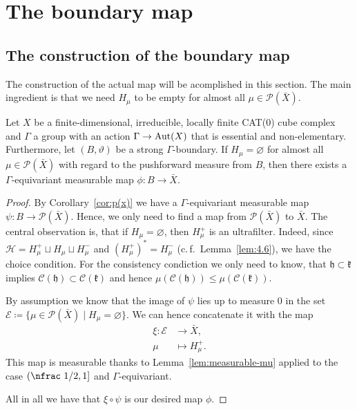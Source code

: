\section{The boundary map}
\label{sec:map}

\subsection{The construction of the boundary map}
\label{sec:treminal-elements}

The construction of the actual map will be acomplished in this section. The main ingredient is that we need \(H_\mu\) to be empty for almost all \(\mu \in \mathcal{P}(\bar X)\). 

\begin{lemma}
  \label{lem:H=0}
  Let \(X\) be a finite-dimensional, irreducible, locally finite CAT(0) cube complex and \(\Gamma\) a group with an action \(\Gamma \to \operatorname{Aut}(X)\) that is essential and non-elementary. Furthermore, let \((B, \vartheta)\) be a strong \(\Gamma\)-boundary. If \(H_\mu = \varnothing\) for almost all \(\mu \in \mathcal{P}(\bar X)\) with regard to the pushforward measure from \(B\), then there exists a \(\Gamma\)-equivariant measurable map \(\phi\colon B \to \bar X\).
\end{lemma}

\begin{proof}
  By Corollary~\ref{cor:p(x)} we have a \(\Gamma\)-equivariant measurable map \(\psi\colon B \to \mathcal{P}(\bar X)\). Hence, we only need to find a map from \(\mathcal{P}(\bar X)\) to \(\bar X\). The central observation is, that if \(H_\mu= \varnothing\), then \(H_\mu^+\) is an ultrafilter. Indeed, since \(\mathcal{H} = H_\mu^+ \sqcup H_\mu \sqcup H_\mu^-\) and \((H_\mu^+)^\ast = H_\mu^-\) (c.\,f.~Lemma~\ref{lem:4.6}), we have the choice condition. For the consistency condiction we only need to know, that \(\mathfrak{h} \subset \mathfrak{k}\) implies \(\mathcal{C}(\mathfrak{h}) \subset \mathcal{C}(\mathfrak{k})\) and hence \(\mu(\mathcal{C}(\mathfrak{h}))\leq \mu(\mathcal{C}(\mathfrak{k}))\).

  By assumption we know that the image of \(\psi\) lies up to measure 0 in the set \(\mathcal{E} \coloneqq \{\mu \in \mathcal{P}(\bar X) \mid H_\mu = \varnothing\}\). We can hence concatenate it with the map
  \begin{align*}
    \xi\colon \mathcal{E} &\to \bar X,\\
    \mu &\mapsto H_\mu^+.
  \end{align*}
  This map is measurable thanks to Lemma~\ref{lem:measurable-mu} applied to the case \({(\text{\nfrac 1/2}, 1]}\) and \(\Gamma\)-equivariant.

  All in all we have that \(\xi \circ \psi\) is our desired map \(\phi\).
\end{proof}

